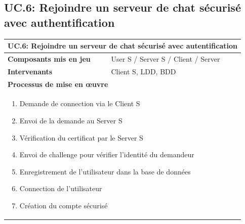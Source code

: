 \documentclass[a4paper,11pt,french]{article}
\begin{document}
\subsection{UC.6: Rejoindre un serveur de chat sécurisé avec authentification}
\begin{center}
	\vspace*{0.7cm}
	\begin{tabularx}{16cm}{|l|X|}
	\hline
	\multicolumn{2}{|l|}{\textbf{UC.6: Rejoindre un serveur de chat sécurisé avec autentification}}\\
	\hline
	\textbf{Composants mis en jeu} & User S / Server S / Client / Server \\
	\hline
	\textbf{Intervenants} & Client S, LDD, BDD \\
	\hline
	\multicolumn{2}{|l|}{\textbf{Processus de mise en \oe uvre}}\\
	\hline
	\multicolumn{2}{|p{15cm}|}{\begin{enumerate}\item Demande de connection via le Client S \item Envoi de la demande au Server S \item Vérification du certificat par le Server S \item Envoi de challenge pour vérifier l'identité du demandeur \item Enregistrement de l'utilisateur dans la base de données \item Connection de l'utilisateur \item Création du compte sécurisé \end{enumerate}}\\
	\hline
	\end{tabularx}
\end{center}
\end{document}
